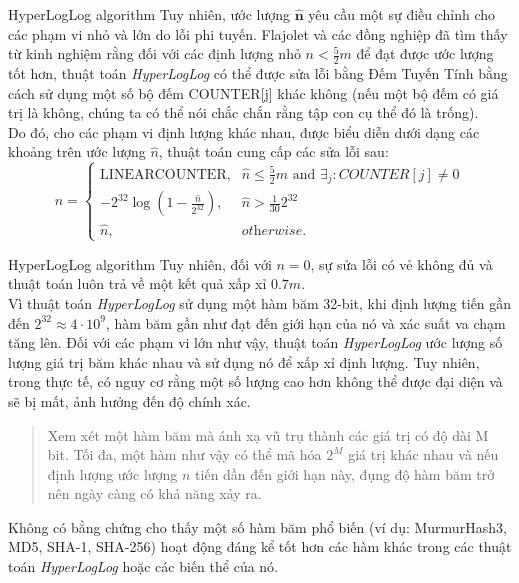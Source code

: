 \documentclass[10pt]{beamer}
\begin{document}
\begin{frame}{HyperLogLog algorithm}
  Tuy nhiên, ước lượng $\hat{\textbf{n}}$ yêu cầu một sự điều chỉnh cho các phạm vi nhỏ và lớn do lỗi phi tuyến. Flajolet và các đồng nghiệp 
  đã tìm thấy từ kinh nghiệm rằng đối với các định lượng nhỏ $n < \frac{5}{2}m$ để đạt được ước lượng tốt hơn, thuật toán \textit{HyperLogLog} 
  có thể được sửa lỗi bằng Đếm Tuyến Tính bằng cách sử dụng một số bộ đếm COUNTER[j] khác không (nếu một bộ đếm có giá trị là không, 
  chúng ta có thể nói chắc chắn rằng tập con cụ thể đó là trống).\\
  
  Do đó, cho các phạm vi định lượng khác nhau, được biểu diễn dưới dạng các khoảng trên ước lượng $\hat{n}$, 
  thuật toán cung cấp các sửa lỗi sau:
  \[
      n = \left\{ \begin{array}{lcl}
          \text{LINEARCOUNTER,} & \hat{n} \leq \frac{5}{2}m \mbox{ and } \exists_j : COUNTER[j] \neq 0 \\ 
          -2^{32}\log\left(1-\frac{\hat{n}}{2^{32}}\right), & \hat{n}>\frac{1}{30}2^{32} \\
          \hat{n}, & \textit{otherwise.}
          \end{array}\right.    
  \]
\end{frame}
\begin{frame}{HyperLogLog algorithm}
  Tuy nhiên, đối với $n = 0$, sự sửa lỗi có vẻ không đủ và thuật toán luôn trả về một kết quả xấp xỉ $0.7m$.\\
  Vì thuật toán \textit{HyperLogLog} sử dụng một hàm băm 32-bit, khi định lượng tiến gần đến $2^{32}\approx 4 \cdot 10^9$, 
  hàm băm gần như đạt đến giới hạn của nó và xác suất va chạm tăng lên. Đối với các phạm vi lớn như vậy, thuật toán \textit{HyperLogLog} 
  ước lượng số lượng giá trị băm khác nhau và sử dụng nó để xấp xỉ định lượng. Tuy nhiên, trong thực tế, có nguy cơ rằng một số lượng cao hơn 
  không thể được đại diện và sẽ bị mất, ảnh hưởng đến độ chính xác.\\
  
  \begin{quote}
      Xem xét một hàm băm mà ánh xạ vũ trụ thành các giá trị có độ dài M bit. Tối đa, một hàm như vậy có thể mã hóa $2^M$ 
      giá trị khác nhau và nếu định lượng ước lượng $n$ tiến dần đến giới hạn này, đụng độ hàm băm trở nên ngày càng có khả năng xảy ra.
      \vspace{0.25cm}
  \end{quote}
  \newpage
  \indent Không có bằng chứng cho thấy một số hàm băm phổ biến (ví dụ: MurmurHash3, MD5, SHA-1, SHA-256) 
  hoạt động đáng kể tốt hơn các hàm khác trong các thuật toán \textit{HyperLogLog} hoặc các biến thể của nó.
\end{frame}
\end{document}
